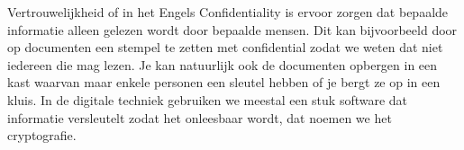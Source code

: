 Vertrouwelijkheid of in het Engels Confidentiality is ervoor zorgen dat bepaalde informatie alleen gelezen wordt door bepaalde mensen. Dit kan bijvoorbeeld door op documenten een stempel te zetten met confidential zodat we weten dat niet iedereen die mag lezen. Je kan natuurlijk ook de documenten opbergen in een kast waarvan maar enkele personen een sleutel hebben of je bergt ze op in een kluis. In de digitale techniek gebruiken we meestal een stuk software dat informatie versleutelt zodat het onleesbaar wordt, dat noemen we het cryptografie.

